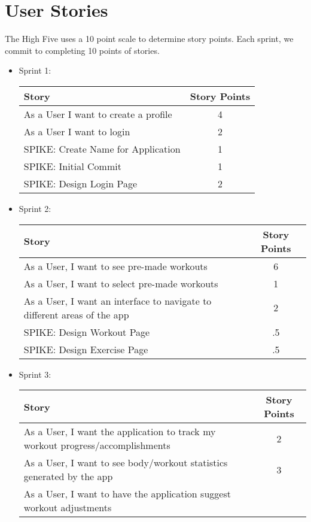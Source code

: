 \documentclass[12pt,letterpaper]{article}
\begin{document}
		\section{User Stories}
			The High Five uses a 10 point scale to determine story points. Each sprint, we commit to completing 10 points of stories.\pagebreak 
			\begin{itemize}
				\item Sprint 1:\\				
				\begin{tabular}{|l|c|}
				\hline 
				Story & Story Points \\ 
				\hline 
				As a User I want to create a profile & 4 \\ 
				\hline 
				As a User I want to login & 2 \\ 
				\hline 
				SPIKE: Create Name for Application & 1 \\ 
				\hline 
				SPIKE: Initial Commit & 1 \\ 
				\hline 
				SPIKE: Design Login Page & 2 \\ 
				\hline 
				\end{tabular} 
				\item Sprint 2:\\
					\begin{tabular}{|l|c|}
					\hline 
					Story & Story Points \\ 
					\hline 
					As a User, I want to see pre-made workouts & 6 \\ 
					\hline 
					As a User, I want to select pre-made workouts & 1 \\ 
					\hline 
					As a User, I want an interface to navigate to different areas of the app & 2 \\ 
					\hline 
					SPIKE: Design Workout Page & .5 \\ 
					\hline 
					SPIKE: Design Exercise Page & .5 \\ 
					\hline 
					\end{tabular} 				
				\item Sprint 3:\\
					\begin{tabular}{|l|c|}
					\hline 
					Story & Story Points \\ 
					\hline 
					As a User, I want the application to track my workout progress/accomplishments & 2 \\ 
					\hline 
					As a User, I want to see body/workout statistics generated by the app  & 3 \\ 
					\hline 
					As a User, I want to have the application suggest workout adjustments

\end{tabular}
\end{itemize}
\end{document}
